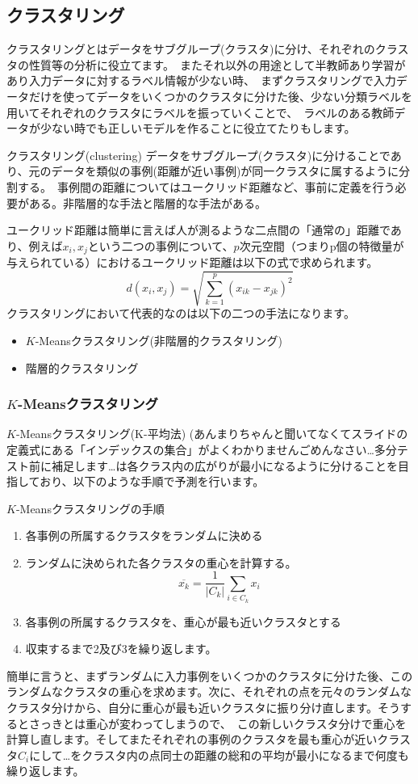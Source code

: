 \documentclass[uplatex]{jsarticle}
\begin{document}
\subsection{クラスタリング}
クラスタリングとはデータをサブグループ(クラスタ)に分け、それぞれのクラスタの性質等の分析に役立てます。\
またそれ以外の用途として半教師あり学習があり入力データに対するラベル情報が少ない時、\
まずクラスタリングで入力データだけを使ってデータをいくつかのクラスタに分けた後、少ない分類ラベルを用いてそれぞれのクラスタにラベルを振っていくことで、\
ラベルのある教師データが少ない時でも正しいモデルを作ることに役立てたりもします。
\begin{itembox}[l]{クラスタリング(clustering)}
  データをサブグループ(クラスタ)に分けることであり、元のデータを類似の事例(距離が近い事例)が同一クラスタに属するように分割する。\
  事例間の距離についてはユークリッド距離など、事前に定義を行う必要がある。非階層的な手法と階層的な手法がある。
\end{itembox}
ユークリッド距離は簡単に言えば人が測るような二点間の「通常の」距離であり、例えば$x_i, x_j$という二つの事例について、$p$次元空間（つまりp個の特徴量が与えられている）におけるユークリッド距離は以下の式で求められます。\
$$d(x_i, x_j) = \sqrt{\sum_{k=1}^p (x_{ik} - x_{jk})^2}$$
クラスタリングにおいて代表的なのは以下の二つの手法になります。\
\begin{itemize}
  \item $K$-Meansクラスタリング(非階層的クラスタリング)
  \item 階層的クラスタリング
\end{itemize}
\subsubsection{$K$-Meansクラスタリング}
$K$-Meansクラスタリング(K-平均法)  (あんまりちゃんと聞いてなくてスライドの定義式にある「インデックスの集合」がよくわかりませんごめんなさい…多分テスト前に補足します…は各クラス内の広がりが最小になるように分けることを目指しており、以下のような手順で予測を行います。
\begin{itembox}[l]{$K$-Meansクラスタリングの手順}
  \begin{enumerate}
   \item 各事例の所属するクラスタをランダムに決める
   \item ランダムに決められた各クラスタの重心を計算する。
   $$\overline{x_k} = \frac{1}{|C_k|}\sum_{i \in C_k}{x_i}$$
   \item 各事例の所属するクラスタを、重心が最も近いクラスタとする
   \item 収束するまで2及び3を繰り返します。
  \end{enumerate}
\end{itembox}
簡単に言うと、まずランダムに入力事例をいくつかのクラスタに分けた後、このランダムなクラスタの重心を求めます。次に、それぞれの点を元々のランダムなクラスタ分けから、自分に重心が最も近いクラスタに振り分け直します。そうするとさっきとは重心が変わってしまうので、\
この新しいクラスタ分けで重心を計算し直します。そしてまたそれぞれの事例のクラスタを最も重心が近いクラスタ$C_i$にして…をクラスタ内の点同士の距離の総和の平均が最小になるまで何度も繰り返します。
\end{document}

